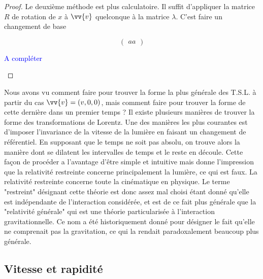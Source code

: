 \documentclass[a4paper,11pt]{report}
\theoremstyle{definition}
\theoremstyle{plain}
\theoremstyle{definition}
\theoremstyle{remark}
\newcommand{\comp}{\begin{center}\textcolor{blue}{A compléter}\end{center}}
\begin{document}
\begin{proof}
            Le deuxième méthode est plus calculatoire. Il suffit d'appliquer la matrice $R$ de rotation de $x$ à $\vv{v}$ quelconque à la matrice $\lambda$. C'est faire un changement de base
            
            \begin{equation}
                \begin{pmatrix}
                aa
                \end{pmatrix}
            \end{equation}
            \comp
            \end{proof}
            
            Nous avons vu comment faire pour trouver la forme la plus générale des T.S.L. à partir du cas $\vv{v} = (v,0,0)$, mais comment faire pour trouver la forme de cette dernière dans un premier temps ? Il existe plusieurs manières de trouver la forme des transformations de Lorentz. Une des manières les plus courantes est d'imposer l'invariance de la vitesse de la lumière en faisant un changement de référentiel. En supposant que le temps ne soit pas absolu, on trouve alors la manière dont se dilatent les intervalles de temps et le reste en découle. Cette façon de procéder a l'avantage d'être simple et intuitive mais donne l'impression que la relativité restreinte concerne principalement la lumière, ce qui est faux. La relativité restreinte concerne toute la cinématique en physique. Le terme "restreint" désignant cette théorie est donc assez mal choisi étant donné qu'elle est indépendante de l'interaction considérée, et est de ce fait plus générale que la "relativité générale" qui est une théorie particularisée à l'interaction gravitationnelle. Ce nom a été historiquement donné pour désigner le fait qu'elle ne comprenait pas la gravitation, ce qui la rendait paradoxalement beaucoup plus générale.
        
        \subsection{Vitesse et rapidité}
        
\end{document}
